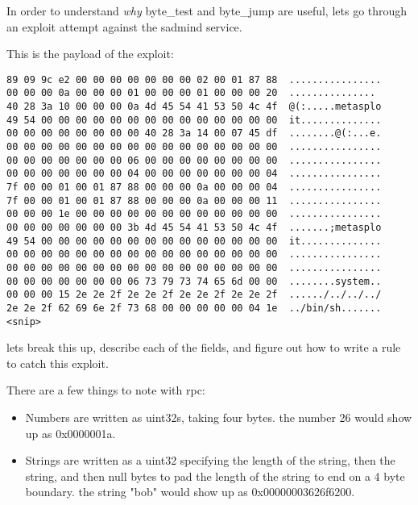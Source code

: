\documentclass[english]{report}
\begin{document}
In order to understand \emph{why} byte\_test and byte\_jump are useful, lets go
through an exploit attempt against the sadmind service.

This is the payload of the exploit:

\begin{verbatim}
89 09 9c e2 00 00 00 00 00 00 00 02 00 01 87 88  ................
00 00 00 0a 00 00 00 01 00 00 00 01 00 00 00 20  ...............
40 28 3a 10 00 00 00 0a 4d 45 54 41 53 50 4c 4f  @(:.....metasplo
49 54 00 00 00 00 00 00 00 00 00 00 00 00 00 00  it..............
00 00 00 00 00 00 00 00 40 28 3a 14 00 07 45 df  ........@(:...e.
00 00 00 00 00 00 00 00 00 00 00 00 00 00 00 00  ................
00 00 00 00 00 00 00 06 00 00 00 00 00 00 00 00  ................
00 00 00 00 00 00 00 04 00 00 00 00 00 00 00 04  ................
7f 00 00 01 00 01 87 88 00 00 00 0a 00 00 00 04  ................
7f 00 00 01 00 01 87 88 00 00 00 0a 00 00 00 11  ................
00 00 00 1e 00 00 00 00 00 00 00 00 00 00 00 00  ................
00 00 00 00 00 00 00 3b 4d 45 54 41 53 50 4c 4f  .......;metasplo
49 54 00 00 00 00 00 00 00 00 00 00 00 00 00 00  it..............
00 00 00 00 00 00 00 00 00 00 00 00 00 00 00 00  ................
00 00 00 00 00 00 00 00 00 00 00 00 00 00 00 00  ................
00 00 00 00 00 00 00 06 73 79 73 74 65 6d 00 00  ........system..
00 00 00 15 2e 2e 2f 2e 2e 2f 2e 2e 2f 2e 2e 2f  ....../../../../
2e 2e 2f 62 69 6e 2f 73 68 00 00 00 00 00 04 1e  ../bin/sh.......
<snip>
\end{verbatim}

lets break this up, describe each of the fields, and figure out
how to write a rule to catch this exploit.  


There are a few things to note with rpc:
\begin{itemize}
\item Numbers are written as uint32s, taking four bytes.  the number 26 would show up as 0x0000001a.
\item Strings are written as a uint32 specifying the length of the string, then the string, and then null bytes to pad the length of the string to end on a 4 byte boundary.  the string "bob" would show up as 0x00000003626f6200.
\end{itemize}
\end{document}
